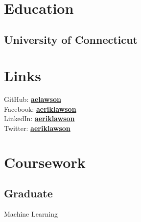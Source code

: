 \documentclass[]{deedy-resume}
\begin{document}
%
%

%
%

%
%

\begin{minipage}[t]{0.38\textwidth}


\section{Education}

\subsection{University of Connecticut}


\section{Links}
GitHub: \href{https://www.github.com/aelawson}{\bf aelawson} \\
Facebook: \href{https://www.facebook.com/aeriklawson}{\bf aeriklawson} \\
LinkedIn:  \href{https://www.linkedin.com/in/aeriklawson}{\bf aeriklawson} \\
Twitter:  \href{https://www.twitter.com/aeriklawson}{\bf aeriklawson} \\


\section{Coursework}
\subsection{Graduate}
Machine Learning \\
\sectionsep


\end{minipage}
\end{document}
